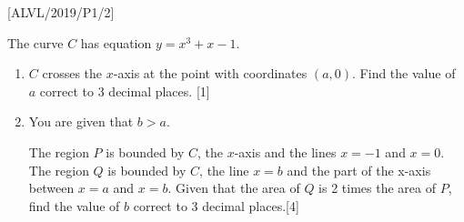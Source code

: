 \item {[}ALVL/2019/P1/2{]}

The curve $C$ has equation $y=x^{3}+x-1$. 
\begin{enumerate}
\item $C$ crosses the $x$-axis at the point with coordinates $\left(a,0\right)$.
Find the value of $a$ correct to 3 decimal places.\hfill{} {[}1{]}
\item You are given that $b>a$. 

The region $P$ is bounded by $C$, the $x$-axis and the lines $x=-1$
and $x=0$. The region $Q$ is bounded by $C$, the line $x=b$ and
the part of the x-axis between $x=a$ and $x=b$. Given that the area
of $Q$ is 2 times the area of $P$, find the value of $b$ correct
to 3 decimal places.\hfill{}{[}4{]}
\end{enumerate}
